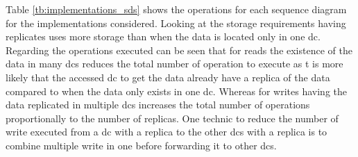 \documentclass[english]{article}
\begin{document}
Table \ref{tb:implementations_sds} shows the operations for each sequence diagram for the implementations considered. Looking at the storage requirements having replicates uses more storage than when the data is located only in one \gls{dc}. Regarding the operations executed can be seen that for reads the existence of the data in many \glspl{dc} reduces the total number of operation to execute as t is more likely that the accessed \gls{dc} to get the data already have a replica of the data compared to when the data only exists in one \gls{dc}. Whereas for writes having the data replicated in multiple \glspl{dc} increases the total number of operations proportionally to the number of replicas. One technic to reduce the number of write executed from a \gls{dc} with a replica to the other \glspl{dc} with a replica is to combine multiple write in one before forwarding it to other \glspl{dc}.
\end{document}
